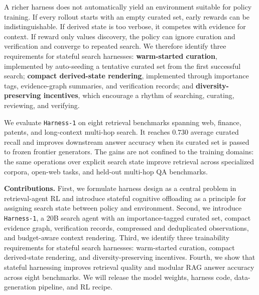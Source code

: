 \documentclass{article}
\newcommand{\sys}{\texttt{Harness-1}\xspace}
\begin{document}
A richer harness does not automatically yield an environment suitable for policy training. If every rollout starts with an
empty curated set, early rewards can be indistinguishable. If derived state is
too verbose, it competes with evidence for context. If reward only values
discovery, the policy can ignore curation and verification and converge to
repeated search. We therefore identify three requirements for stateful search
harnesses: \textbf{warm-started curation}, implemented by auto-seeding a
tentative curated set from the first successful search; \textbf{compact
derived-state rendering}, implemented through importance tags, evidence-graph
summaries, and verification records; and \textbf{diversity-preserving
incentives}, which encourage a rhythm of searching, curating, reviewing, and
verifying.

We evaluate \sys on eight retrieval benchmarks spanning web, finance, patents,
and long-context multi-hop search. It reaches $0.730$ average curated recall and
improves downstream answer accuracy when its curated set is passed to frozen
frontier generators. The gains are not confined to the training domains: the
same operations over explicit search state improve retrieval across specialized
corpora, open-web tasks, and held-out multi-hop QA benchmarks.

\textbf{Contributions.}
First, we formulate harness design as a central problem in retrieval-agent RL
and introduce stateful cognitive offloading as a principle for assigning search
state between policy and environment. Second, we introduce \sys, a 20B search agent with an importance-tagged curated set, compact evidence graph,
verification records, compressed and deduplicated observations, and
budget-aware context rendering. Third, we identify three trainability
requirements for stateful search harnesses: warm-started curation, compact
derived-state rendering, and diversity-preserving incentives. Fourth, we show
that stateful harnessing improves retrieval quality and modular RAG answer
accuracy across eight benchmarks. We will release the model weights, harness
code, data-generation pipeline, and RL recipe.

\end{document}
